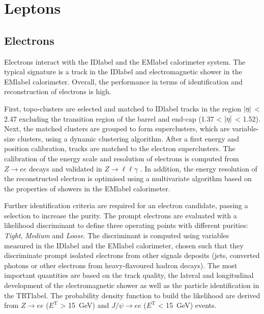 \section{Leptons}

\subsection{Electrons}

Electrons interact with the \acrshort{IDlabel} and the \acrshort{EMlabel} calorimeter system. The typical signature is a track in the \acrshort{IDlabel} and electromagnetic shower in the \acrshort{EMlabel} calorimeter. Overall, the performance in terms of identification and reconstruction of electrons is high.

First, topo-clusters are selected and matched to \acrshort{IDlabel} tracks in the region $\abs{\eta}$ < 2.47 excluding the transition region of the barrel and end-cap (1.37 < $\abs{\eta}$ < 1.52). Next, the matched clusters are grouped to form superclusters, which are variable-size clusters, using a dynamic clustering algorithm. After a first energy and position calibration, tracks are matched to the electron superclusters. The calibration of the energy scale and resolution of electrons is computed from $Z\rightarrow ee$ decays and validated in $Z\rightarrow \ell\ell\gamma$ %
. In addition, the energy resolution of the reconstructed electron is optimised using a multivariate algorithm based on the properties of showers in the \acrshort{EMlabel} calorimeter.

Further identification criteria are required for an electron candidate, passing a selection to increase the purity. The prompt electrons are evaluated with a likelihood discriminant to define three operating points with different purities: \textit{Tight}, \textit{Medium} and \textit{Loose}. The discriminant is computed using variables measured in the \acrshort{IDlabel} and the \acrshort{EMlabel} calorimeter, chosen such that they discriminate prompt isolated electrons from other signals deposits (jets, converted photons or other electrons from heavy-flavoured hadron decays). The most important quantities are based on the track quality, the lateral and longitudinal development of the electromagnetic shower as well as the particle identification in the \acrshort{TRTlabel}. The probability density function to build the likelihood are derived from $Z\rightarrow ee$ ($E^\text{T}$ > 15~GeV) and $J/\psi \rightarrow ee$ ($E^\text{T}$ < 15~GeV) events.

